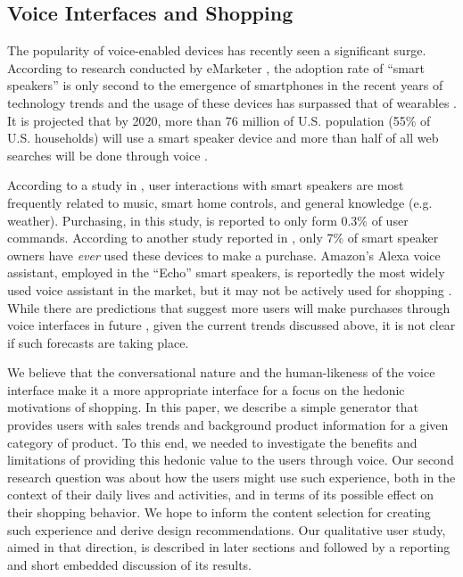 \subsection{Voice Interfaces and Shopping}

The popularity of voice-enabled devices has recently seen a significant surge. According to research conducted by eMarketer \cite{emarketer}, the adoption rate of ``smart speakers'' is only second to the emergence of smartphones in the recent years of technology trends and the usage of these devices has surpassed that of wearables \cite{nowear}. It is projected that by 2020, more than 76 million of U.S. population (55\% of U.S. households) will use a smart speaker device \cite{emarketer} and more than half of all web searches will be done through voice \cite{search}. 

According to a study in \cite{alexause}, user interactions with smart speakers are most frequently related to music, smart home controls, and general knowledge (e.g. weather). Purchasing, in this study, is reported to only form 0.3\% of user commands. According to another study reported in \cite{sevenlonely}, only 7\% of smart speaker owners have \textit{ever} used these devices to make a purchase. Amazon's Alexa voice assistant, employed in the ``Echo'' smart speakers, is reportedly \cite{alexaftw} the most widely used voice assistant in the market, but it may not be actively used for shopping \cite{alexahehe}. While there are predictions that suggest more users will make purchases through voice interfaces in future \cite{clark}, given the current trends discussed above, it is not clear if such forecasts are taking place. 

We believe that the conversational nature and the human-likeness of the voice interface make it a more appropriate interface for a focus on the hedonic motivations of shopping. In this paper, we describe a simple generator that provides users with sales trends and background product information for a given category of product. To this end, we needed to investigate the benefits and limitations of providing this hedonic value to the users through voice. Our second research question was about how the users might use such experience, both in the context of their daily lives and activities, and in terms of its possible effect on their shopping behavior. We hope to inform the content selection for creating such experience and derive design recommendations. Our qualitative user study, aimed in that direction, is described in later sections and followed by a reporting and short embedded discussion of its results. 

